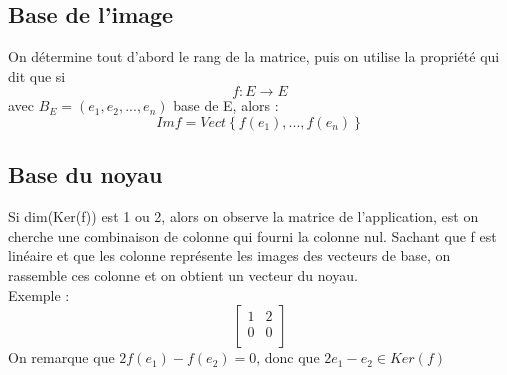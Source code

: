 \subsection{Base de l'image}
On détermine tout d'abord le rang de la matrice, puis on utilise la propriété qui dit que si 
$$f : E \rightarrow E$$
avec $B_E=(e_1,e_2,...,e_n)$ base de E, alors :
$$Im f = Vect\left\{f(e_1),...,f(e_n)\right\}$$
\subsection{Base du noyau}
Si dim(Ker(f)) est 1 ou 2, alors on observe la matrice de l'application, est on cherche une combinaison de colonne qui fourni la colonne nul. Sachant que f est linéaire et que les colonne représente les images des vecteurs de base, on rassemble ces colonne et on obtient un vecteur du noyau.\\
Exemple : 
$$\begin{bmatrix}
  1 & 2 \\
  0 & 0 \\
\end{bmatrix}$$
On remarque que $2f(e_1)-f(e_2)=0$, donc que $2e_1-e_2 \in Ker(f)$ 
